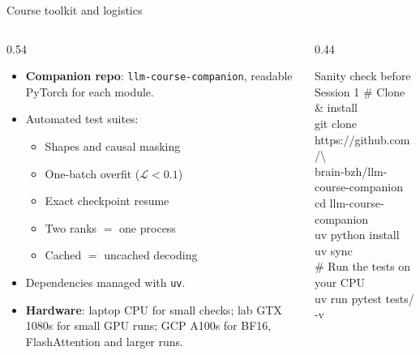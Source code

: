 \documentclass[handout]{beamer}
\begin{document}
\begin{frame}{Course toolkit and logistics}
  \begin{columns}[c]
    \begin{column}{0.54\linewidth}
      \begin{itemize}
          \setlength{\itemsep}{4pt}
        \item \textbf{Companion repo}: \texttt{llm-course-companion}, readable PyTorch for each module.
        \item Automated test suites:
          \begin{itemize}
            \item Shapes and causal masking
            \item One-batch overfit ($\mathcal{L} < 0.1$)
            \item Exact checkpoint resume
            \item Two ranks $=$ one process
            \item Cached $=$ uncached decoding
          \end{itemize}
        \item Dependencies managed with \texttt{uv}.
        \item \textbf{Hardware}: laptop CPU for small checks; lab GTX 1080s for small GPU runs; GCP A100s for BF16, FlashAttention and larger runs.
      \end{itemize}
    \end{column}
    \begin{column}{0.44\linewidth}
      \begin{block}{Sanity check before Session 1}
        \ttfamily\scriptsize
        \# Clone \& install\\
        git clone https://github.com/\textbackslash\\
        brain-bzh/llm-course-companion\\
        cd llm-course-companion\\
        uv python install\\
        uv sync\\
        \vspace{4pt}
        \# Run the tests on your CPU\\
        uv run pytest tests/ -v
      \end{block}
    \end{column}
  \end{columns}
\end{frame}
\end{document}
